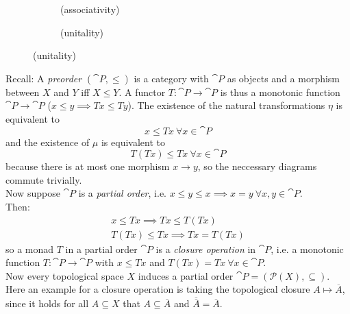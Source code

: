 \begin{definition}[monad]
\begin{figure}[H]
\centering
\begin{subfigure}{0.4\textwidth}
\centering
\caption*{(associativity)}
\end{subfigure}
\hspace{2em}
\begin{subfigure}{0.4\textwidth}
\centering
\caption*{(unitality)}
\end{subfigure}
\end{figure}

\end{definition}

\begin{example}[preorder]
Recall: A \textit{preorder} $(\cat{P},\le)$ is a category with $\cat{P}$ as objects and 
a morphism between $X$ and $Y$ iff $X \le Y$.
A functor $T\colon \cat{P} \to \cat{P}$ is thus a monotonic function $\cat{P}\to \cat{P}$
($x \le y \implies Tx\le Ty$).
The existence of the natural transformations $\eta$ is equivalent to
\[x \le Tx \ \forall x \in \cat{P}\]
and the existence of $\mu$ is equivalent to
\[T(Tx) \le Tx \ \forall x \in \cat{P}\] 
because there is at most one morphism $x \to y$, so the neccessary diagrams commute trivially.\\
Now suppose $\cat{P}$ is a \textit{partial order}, i.e. $x \le y \le x \implies x = y \ \forall x,y \in \cat{P}$. \\
Then:
\begin{align*}
    x \le Tx \implies Tx \le T(Tx) \\
    T(Tx) \le Tx \implies Tx = T(Tx)
\end{align*}
so a monad $T$ in a partial order $\cat{P}$ is a \textit{closure operation} in $\cat{P}$, i.e. 
a monotonic function $T \colon \cat{P} \to \cat{P}$ 
with $x \le Tx$ and $T(Tx)=Tx \ \forall x \in \cat{P}.$ \\
Now every topological space $X$ induces a partial order $\cat{P} = (\mathscr{P}(X),\subseteq)$.
Here an example for a closure operation is taking the topological closure $A \mapsto \overline{A}$,
since it holds for all $A \subseteq X$ that $A \subseteq \overline{A}$ and
$\overline{\overline{A}} = \overline{A}$.
\end{example}


